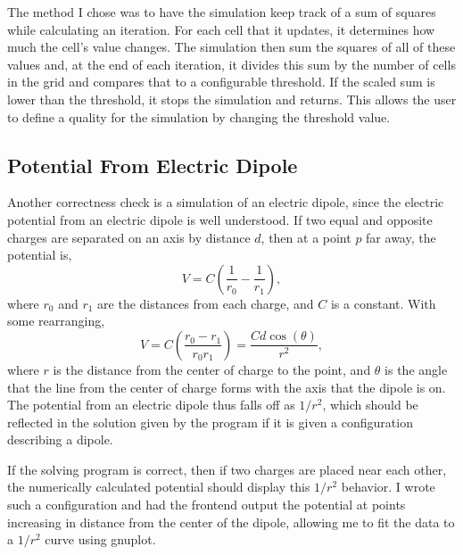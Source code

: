 The method I chose was to have the simulation keep track of a sum of squares while calculating an iteration. For each cell
that it updates, it determines how much the cell's value changes. The simulation then sum the squares of all of these values
and, at the end of each iteration, it divides this sum by the number of cells in the grid and compares that to a configurable threshold.
If the scaled sum is lower than the threshold, it stops the simulation and returns. This allows the user to define a quality for
the simulation by changing the threshold value.









\subsection{Potential From Electric Dipole}
Another correctness check is a simulation of an electric dipole, since the electric potential from an electric dipole is well understood.
If two equal and opposite charges are separated on an axis by distance $d$, then at a point $p$ far away, the
potential is,
$$V = C\left(\frac{1}{r_0} - \frac{1}{r_1}\right),$$
where $r_0$ and $r_1$ are the distances from each charge, and $C$ is a constant. With some rearranging,
$$V = C\left(\frac{r_0 - r_1}{r_0 r_1}\right) = \frac{C d \cos(\theta)}{r^2},$$
where $r$ is the distance from the center of charge to the point, and $\theta$ is the angle that the line from the
center of charge forms with the axis that the dipole is on\cite{griffiths}. The potential from an electric dipole thus falls off as $1/r^2$,
which should be reflected in the solution given by the program if it is given a configuration describing a dipole.

If the solving program is correct, then if two charges are placed near each other, the numerically calculated potential
should display this $1/r^2$ behavior. I wrote such a configuration and had the frontend output the potential at points
increasing in distance from the center of the dipole, allowing me to fit the data to a $1/r^2$ curve using gnuplot.















